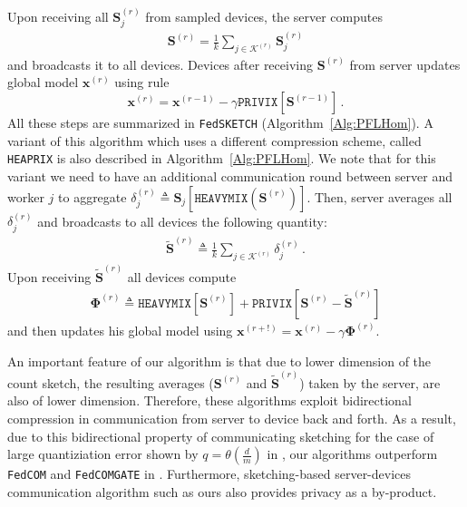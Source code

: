 Upon receiving all $\mathbf{S}_j^{(r)}$ from sampled devices, the server computes \begin{align}\mathbf{S}^{(r)}=\frac{1}{k}\sum_{j\in\mathcal{K}^{(r)}}\mathbf{S}_j^{(r)}\label{eq:average-skestching}
\end{align} and broadcasts it to all devices. Devices after receiving $\mathbf{S}^{(r)}$ from server updates  global model $\boldsymbol{x}^{(r)}$ using rule $$\boldsymbol{x}^{(r)}=\boldsymbol{x}^{(r-1)}-\gamma \texttt{PRIVIX}\left[\mathbf{S}^{(r-1)}\right]\, .$$
All these steps are summarized in \texttt{FedSKETCH} (Algorithm~\ref{Alg:PFLHom}). A variant of this algorithm which uses a different compression scheme, called \texttt{HEAPRIX} is also described in Algorithm~\ref{Alg:PFLHom}. We note that for this variant we need to have an additional communication round between server and worker $j$ to aggregate $\delta_j^{(r)}\triangleq \mathbf{S}_j\left[\texttt{HEAVYMIX}(\mathbf{S}^{(r)})\right]$. Then, server averages all $\delta^{(r)}_j$ and broadcasts to all devices the following quantity:
\begin{align}
\tilde{\mathbf{S}}^{(r)}\triangleq \frac{1}{k}\sum_{j\in\mathcal{K}^{(r)}}\delta^{(r)}_j \, .\label{eq:glbl-updts}
\end{align}
Upon receiving $\tilde{\mathbf{S}}^{(r)}$  all devices compute
\begin{align}
    {\mathbf{\Phi}}^{(r)}\triangleq \texttt{HEAVYMIX}\left[{\mathbf{S}}^{(r)}\right]+\texttt{PRIVIX}\left[{\mathbf{S}}^{(r)}- \tilde{\mathbf{S}}^{(r)}\right]
\end{align}
and then updates his global model using $\boldsymbol{x}^{(r+!)}=\boldsymbol{x}^{(r)}-\gamma{\mathbf{\Phi}}^{(r)}$.

\begin{remark}\label{rmrk:bidirect}
An important feature of our algorithm is that due to lower dimension of the count sketch, the resulting averages ($\mathbf{S}^{(r)}$ and  $\tilde{\mathbf{S}}^{(r)}$) taken by the server, are also of lower dimension. 
Therefore, these algorithms exploit bidirectional compression in communication from server to device back and forth. 
As a result, due to this bidirectional property of communicating sketching for the case of large quantiziation error shown by $q=\theta(\frac{d}{m})$ in \cite{haddadpour2020federated}, our algorithms outperform \texttt{FedCOM} and \texttt{FedCOMGATE} in \cite{haddadpour2020federated}. 
Furthermore, sketching-based server-devices communication algorithm such as ours also provides privacy as a by-product.
\end{remark}

